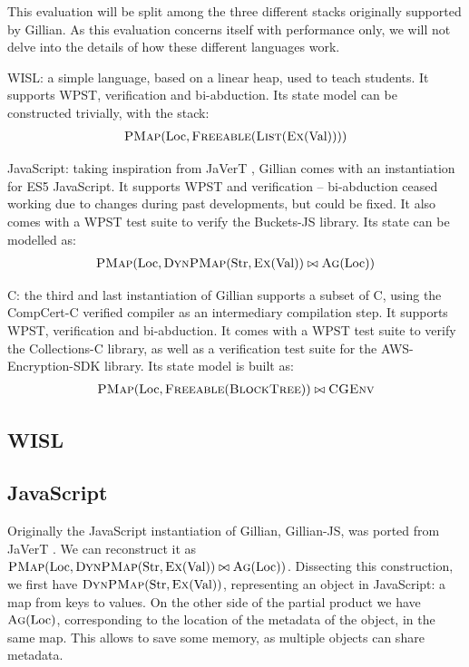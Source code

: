 This evaluation will be split among the three different stacks originally supported by Gillian. As this evaluation concerns itself with performance only, we will not delve into the details of how these different languages work.
\begin{compactitem}
 \item WISL: a simple language, based on a linear heap, used to teach students. It supports WPST, verification and bi-abduction. Its state model can be constructed trivially, with the stack:
	\begin{align*}
 	 	\textsc{PMap}(\text{Loc}, \textsc{Freeable}(\textsc{List}(\textsc{Ex}(\text{Val}))))
	\end{align*}
 \item JavaScript: taking inspiration from JaVerT \cite{javert1, javert2}, Gillian comes with an instantiation for ES5 JavaScript. It supports WPST and verification -- bi-abduction ceased working due to changes during past developments, but could be fixed. It also comes with a WPST test suite to verify the Buckets-JS library. Its state can be modelled as:
	\begin{align*}
		\textsc{PMap}(\text{Loc}, \textsc{DynPMap}(\text{Str}, \textsc{Ex}(\text{Val})) \bowtie \textsc{Ag}(\text{Loc}))
	\end{align*}
\item C: the third and last instantiation of Gillian supports a subset of C, using the CompCert-C verified compiler as an intermediary compilation step. It supports WPST, verification and bi-abduction. It comes with a WPST test suite to verify the Collections-C library, as well as a verification test suite for the AWS-Encryption-SDK library. Its state model is built as:
	\begin{align*}
		\textsc{PMap}(\text{Loc}, \textsc{Freeable}(\textsc{BlockTree})) \bowtie \textsc{CGEnv}
	\end{align*}
 \end{compactitem}


\subsection{WISL}


\subsection{JavaScript}

Originally the JavaScript instantiation of Gillian, Gillian-JS, was ported from JaVerT \cite{javert1,javert2}. We can reconstruct it as $\textsc{PMap}(\text{Loc}, \textsc{DynPMap}(\text{Str}, \textsc{Ex}(\text{Val})) \bowtie \textsc{Ag}(\text{Loc}))$. Dissecting this construction, we first have $\textsc{DynPMap}(\text{Str}, \textsc{Ex}(\text{Val}))$, representing an object in JavaScript: a map from keys to values. On the other side of the partial product we have $\textsc{Ag}(\text{Loc})$, corresponding to the location of the metadata of the object, in the same map. This allows to save some memory, as multiple objects can share metadata.

